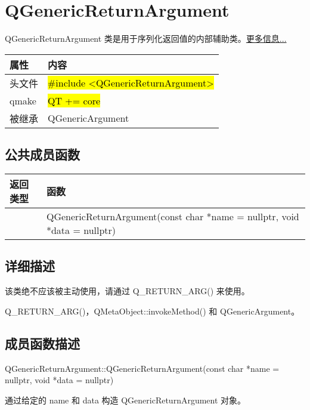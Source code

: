 \chapter{QGenericReturnArgument}

QGenericReturnArgument 类是用于序列化返回值的内部辅助类。\href{https://github.com/JackLovel/QtDocumentCN/blob/master/Src/G/QGenericReturnArgument/QGenericReturnArgument.md#%E8%AF%A6%E7%BB%86%E6%8F%8F%E8%BF%B0}{更多信息...}


\begin{tabular}{|l|l|}
\hline
属性& 	内容\\
\hline
头文件& 	\hl{\#include <QGenericReturnArgument>}\\
\hline
qmake& 	\hl{QT += core}\\
\hline
被继承& 	QGenericArgument\\
\hline
\end{tabular}


\splitLine

\section{公共成员函数}

\begin{tabular}{|l|m{30em}|}
\hline
返回类型& 	函数\\
\hline
 	&QGenericReturnArgument(const char *name = nullptr, void *data = nullptr)\\
\hline
\end{tabular}

\splitLine

\section{详细描述}

该类绝不应该被主动使用，请通过 Q\_RETURN\_ARG() 来使用。



\begin{seeAlso}
	Q\_RETURN\_ARG()，QMetaObject::invokeMethod() 和
QGenericArgument。
\end{seeAlso}

\splitLine

\section{成员函数描述}

QGenericReturnArgument::QGenericReturnArgument(const char *name = nullptr, void *data = nullptr)

通过给定的 name 和 data 构造 QGenericReturnArgument 对象。

